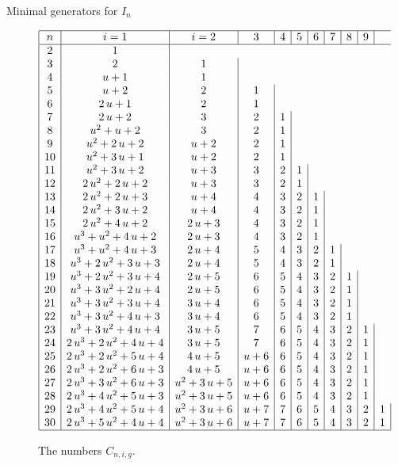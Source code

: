 \documentclass[reqno,10pt]{amsart}
\theoremstyle{definition}
\theoremstyle{remark}
\theoremstyle{plain}
\begin{document}
\begin{section}{Minimal generators for \(I_n\)}
\begin{figure}[p]
\begin{center}
{}
    \end{center}
  \end{figure}

  \begin{figure}[p]
    \begin{center}
      \leavevmode
      \caption{The numbers \(C_{n,i,g}\).}
      \label{fig:Cnig}
      \tiny{
      \begin{displaymath}
        \begin {array}{|c|c|c|c|c|c|c|c|c|c|c|c|} 
          \hline
          n & i=1 & i=2 & 3 & 4 & 5 & 6 & 7 &8 & 9\\ \hline
2&1\\
3&2&1\\
4&u+1&1\\
5&u+2&2&1\\
6&2\,u+1&2&1\\
7&2\,u+2&3&2&1\\
8&{u}^{2}+u+2&3&2&1\\
9&{u}^{2}+2\,u+2&u+2&2&1\\
10&{u}^{2}+3\,u+1&u+2&2&1\\
11&{u}^{2}+3\,u+2&u+3&3&2&1\\
12&2\,{u}^{2}+2\,u+2&u+3&3&2&1
\\13&2\,{u}^{2}+2\,u+3&u+4&4&3&2&1
\\14&2\,{u}^{2}+3\,u+2&u+4&4&3&2&1
\\15&2\,{u}^{2}+4\,u+2&2\,u+3&4&3&
2&1\\16&{u}^{3}+{u}^{2}+4\,u+2&2
\,u+3&4&3&2&1\\17&{u}^{3}+{u}^{2
}+4\,u+3&2\,u+4&5&4&3&2&1\\18&{u}^
{3}+2\,{u}^{2}+3\,u+3&2\,u+4&5&4&3&2&1\\
19&{u}^{3}+2\,{u}^{2}+3\,u+4&2\,u+5&6&
5&4&3&2&1\\
20&{u}^{3}+3\,{u}^{2}+2\,
u+4&2\,u+5&6&5&4&3&2&1\\
21&{u}^{3}+3\,{u}^{2}+3\,u+4&3\,u+4&6&5&4&3&2&1\\
22&{u}^{3}+3\,{u}^{2}+4\,u+3&3\,u+4&6&5&4&3&2&1\\23&{u}^{3}+3\,{u}^{2}+4\,
u+4&3\,u+5&7&6&5&4&3&2&1\\24&2\,{u}^{3
}+2\,{u}^{2}+4\,u+4&3\,u+5&7&6&5&4&3&2&1\\
25&2\,{u}^{3}+2\,{u}^{2}+5\,u+4&4\,u+5
&u+6&6&5&4&3&2&1 \\
26&2\,{u}^{3}+2\,{u}^{2}+6\,u+3&4\,u+5
&u+6&6&5&4&3&2&1\\
27&2\,{u}^{3}+3\,{u}^{2}+6\,u+3&{u}^{2}+3\,u+5&u+6&6&5&4&3&2&1
\\
28&2\,{u}^{3}+4\,{u}^{2}+5\,
u+3&{u}^{2}+3\,u+5&u+6&6&5&4&3&2&1
\\
29&2\,{u}^{3}+4\,{u}^{2}+5\,u+4&{u}^{2
}+3\,u+6&u+7&7&6&5&4&3&2&1\\
30&2\,{u}^{3}+5\,{u}^{2}+4\,u+4&{u}^{2}+3\,u+6&u+7&7&6&5&4
&3&2&1
\\ \hline
\end {array}
      \end{displaymath}

}
\end{center}
\end{figure}
\end{section}
\end{document}
